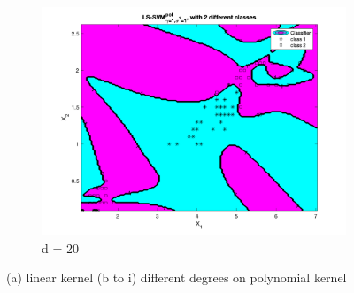 \documentclass[a4paper, 11pt, one column]{article}
\begin{document}
\begin{figure}[]
\begin{subfigure}{0.33\linewidth}
            \includegraphics[width=\linewidth]{images/ls_svm._poly_deg20.png}
            \caption{d = 20}
        \end{subfigure}
  
        \caption{(a) linear kernel (b to i) different degrees on polynomial kernel}
        
        \label{fig:linpoly}
\end{figure}
\end{document}
